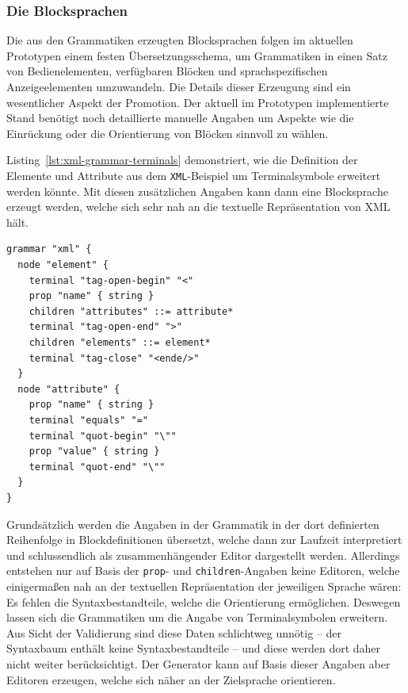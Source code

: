 \documentclass[paper=a4,fontsize=11pt,parskip=half]{scrartcl}
\begin{document}
\subsubsection{Die Blocksprachen}

Die aus den Grammatiken erzeugten Blocksprachen folgen im aktuellen Prototypen einem festen Übersetzungsschema, um Grammatiken in einen Satz von Bedienelementen, verfügbaren Blöcken und sprachspezifischen Anzeigeelementen umzuwandeln. Die Details dieser Erzeugung sind ein wesentlicher Aspekt der Promotion. Der aktuell im Prototypen implementierte Stand benötigt noch detaillierte manuelle Angaben um Aspekte wie die Einrückung oder die Orientierung von Blöcken sinnvoll zu wählen.

Listing~\ref{lst:xml-grammar-terminals} demonstriert, wie die Definition der Elemente und Attribute aus dem \texttt{XML}-Beispiel um Terminalsymbole erweitert werden könnte. Mit diesen zusätzlichen Angaben kann dann eine Blocksprache erzeugt werden, welche sich sehr nah an die textuelle Repräsentation von XML hält.

\begin{lstlisting}[float=h, label={lst:xml-grammar-terminals},caption={Terminalsymbole für Attribute und Elemente in \texttt{XML} },captionpos=b,language={Grammar}]
grammar "xml" {
  node "element" {
    terminal "tag-open-begin" "<"
    prop "name" { string }
    children "attributes" ::= attribute*
    terminal "tag-open-end" ">"
    children "elements" ::= element*
    terminal "tag-close" "<ende/>"
  }
  node "attribute" {
    prop "name" { string }
    terminal "equals" "="
    terminal "quot-begin" "\""
    prop "value" { string }
    terminal "quot-end" "\""
  }
}
\end{lstlisting}

Grundsätzlich werden die Angaben in der Grammatik in der dort definierten Reihenfolge in Blockdefinitionen übersetzt, welche dann zur Laufzeit interpretiert und schlussendlich als zusammenhängender Editor dargestellt werden. Allerdings entstehen nur auf Basis der \texttt{prop}- und \texttt{children}-Angaben keine Editoren, welche einigermaßen nah an der textuellen Repräsentation der jeweiligen Sprache wären: Es fehlen die Syntaxbestandteile, welche die Orientierung ermöglichen. Deswegen lassen sich die Grammatiken um die Angabe von Terminalsymbolen erweitern. Aus Sicht der Validierung sind diese Daten schlichtweg unnötig -- der Syntaxbaum enthält keine Syntaxbestandteile -- und diese werden dort daher nicht weiter berücksichtigt. Der Generator kann auf Basis dieser Angaben aber Editoren erzeugen, welche sich näher an der Zielsprache orientieren.
\end{document}
